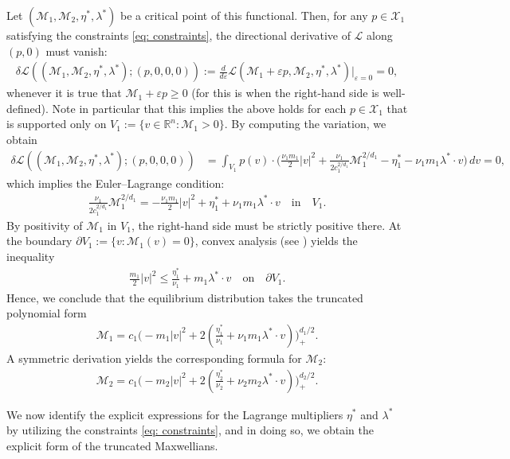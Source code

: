 \documentclass[10pt,reqno]{amsart}
\numberwithin{equation}{section}
\newcommand{\R}{\mathbb R}
\newcommand{\pa}{\partial}
\newcommand{\calX}{\mathcal X}
\newcommand{\calL}{\mathcal L}
\begin{document}
Let $(\mathcal{M}_1,\mathcal{M}_2,\eta^*,\lambda^*)$ be a critical point of this functional. Then, for any $p \in \mathcal{X}_1$ satisfying the constraints \eqref{eq: constraints}, the directional derivative of $\mathcal{L}$ along $(p, 0)$ must vanish: 
\begin{align*}
    \delta\calL((\mathcal{M}_1, \mathcal M_2, \eta^*, \lambda^*); (p,0,0,0) ) := \frac{d}{d\varepsilon} \calL(\mathcal M_1 + \varepsilon p, \mathcal M_2, \eta^*, \lambda^*) \Big|_{\varepsilon = 0} = 0,
\end{align*}
whenever it is true that $\mathcal{M}_1 + \varepsilon p \ge 0$ (for this is when the right-hand side is well-defined). Note in particular that this implies the above holds for each $p\in \calX_1$ that is supported only on $V_1 := \{v\in \R^n: \mathcal M_1 > 0\}$. By computing the variation, we obtain
\begin{align*}
    \delta \calL((\mathcal M_1, \mathcal{M}_2, \eta^*, \lambda^*);(p,0,0,0)) &= \int_{V_1} p(v)\cdot \Big( \frac{\nu_1 m_1}{2}|v|^2 + \frac{\nu_1}{2c_1^{2/d_1}}\mathcal M_1^{2/d_1} - \eta^*_1 -  \nu_1 m_1 \lambda^* \cdot v \Big) \,dv = 0,
\end{align*}
which implies the Euler--Lagrange condition:
\begin{align*}
    \frac{\nu_1}{2c_1^{2/d_1}}\mathcal M_1^{2/d_1} = -\frac{\nu_1 m_1}{2}|v|^2 + \eta_1^* + \nu_1 m_1\lambda^*\cdot v \quad \text{in}\quad V_1.
\end{align*}
By positivity of $\mathcal{M}_1$ in $V_1$, the right-hand side must be strictly positive there. At the boundary $\partial V_1 := \{ v : \mathcal{M}_1(v) = 0 \}$, convex analysis (see \cite[Section 3.1]{B99}) yields the inequality
\begin{align*}
    \frac{m_1}{2}|v|^2 \le \frac{\eta^*_1}{\nu_1} +  m_1\lambda^*\cdot v \quad \text{on}\quad \pa V_1.
\end{align*}
Hence, we conclude that the equilibrium distribution takes the truncated polynomial form
\begin{align*}
    \mathcal M_1 = c_1 \Big(-m_1|v|^2 + 2(\frac{\eta_1^*}{\nu_1} +  \nu_1 m_1\lambda^*\cdot v) \Big)_+^{d_1/2}.
\end{align*}
A symmetric derivation yields the corresponding formula for $\mathcal{M}_2$:
\begin{align*}
    \mathcal M_2 = c_1 \Big(-m_2|v|^2 + 2(\frac{\eta_2^*}{\nu_2} + \nu_2 m_2\lambda^*\cdot v) \Big)_+^{d_2/2}.
\end{align*}

We now identify the explicit expressions for the Lagrange multipliers $\eta^*$ and $\lambda^*$ by utilizing the constraints \eqref{eq: constraints}, and in doing so, we obtain the explicit form of the truncated Maxwellians.
\end{document}
